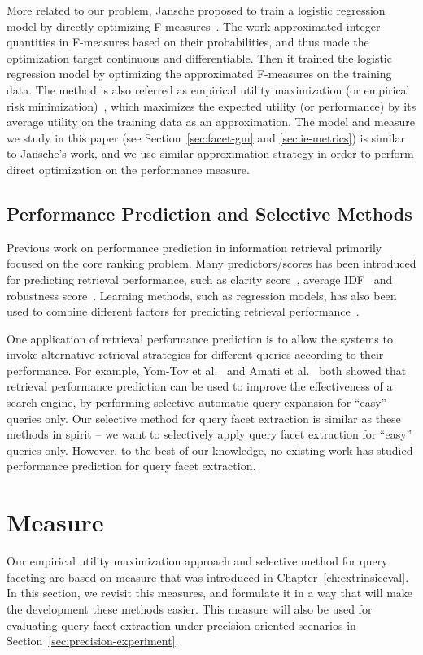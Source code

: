 More related to our problem, Jansche proposed to train a logistic regression model by directly optimizing F-measures~\cite{jansche2005maximum}. The work approximated integer quantities in F-measures based on their probabilities, and thus made the optimization target continuous and differentiable. Then it trained the logistic regression model by optimizing the approximated F-measures on the training data. The method is also referred as empirical utility maximization (or empirical risk minimization)~\cite{ye2012optimizing}, which maximizes the expected utility (or performance) by its average utility on the training data as an approximation. The model and measure we study in this paper (see Section~\ref{sec:facet-gm} and \ref{sec:ie-metrics}) is similar to Jansche's work, and we use similar approximation strategy in order to perform direct optimization on the performance measure.

\subsection{Performance Prediction and Selective Methods}
Previous work on performance prediction in information retrieval primarily focused on the core ranking problem. Many predictors/scores has been introduced for predicting retrieval performance, such as clarity score~\cite{cronen2002predicting}, average IDF~\cite{tomlinson2004robust} and robustness score~\cite{zhou2006ranking}. Learning methods, such as regression models, has also been used to combine different factors for predicting retrieval performance~\cite{kwok2004trec,balasubramanian2010predicting,yom2005learning}. 

One application of retrieval performance prediction is to allow the systems to invoke alternative retrieval strategies for different queries according to their performance. For example, Yom-Tov et al.~\cite{yom2005learning} and Amati et al.~\cite{amati2004query} both showed that retrieval performance prediction can be used to improve the effectiveness of a search engine, by performing selective
automatic query expansion for ``easy'' queries only. Our selective method for query facet extraction is similar as these methods in spirit -- we want to selectively apply query facet extraction for ``easy'' queries only. However, to the best of our knowledge, no existing work has studied performance prediction for query facet extraction.

\section{\PRF Measure}
\label{sec:precision-measure}
Our empirical utility maximization approach and selective method for query faceting are based on \PRF measure that was introduced in Chapter~\ref{ch:extrinsiceval}. In this section, we revisit this measures, and formulate it in a way that will make the development these methods easier. This measure will also be used for evaluating query facet extraction under precision-oriented scenarios in Section~\ref{sec:precision-experiment}.

